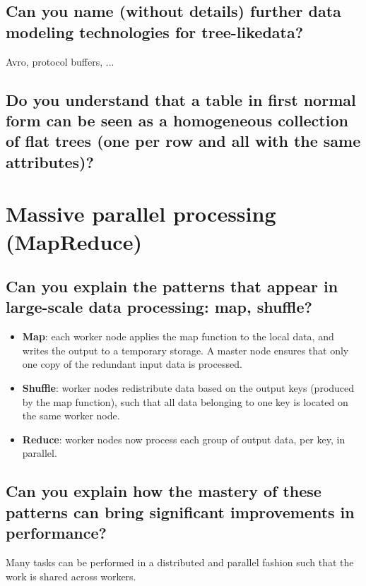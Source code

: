 \documentclass{article}
\begin{document}
\subsection{Can you name (without details) further data modeling technologies for tree-likedata?}

Avro, protocol buffers, ...

\subsection{Do you understand that a table in first normal form can be seen as a homogeneous collection of flat trees (one per row and all with the same attributes)?}





\section{Massive parallel processing (MapReduce)}
\subsection{Can you explain the patterns that appear in large-scale data processing: map, shuffle?}

\begin{itemize}
    \item \textbf{Map}: each worker node applies the map function to the local data, and writes the output to a temporary storage. A master node ensures that only one copy of the redundant input data is processed.

\item \textbf{Shuffle}: worker nodes redistribute data based on the output keys (produced by the map function), such that all data belonging to one key is located on the same worker node.

\item \textbf{Reduce}: worker nodes now process each group of output data, per key, in parallel.

\end{itemize}

\subsection{Can you explain how the mastery of these patterns can bring significant improvements in performance?}

Many tasks can be performed in a distributed and parallel fashion such that the work is shared across workers. 
\end{document}

